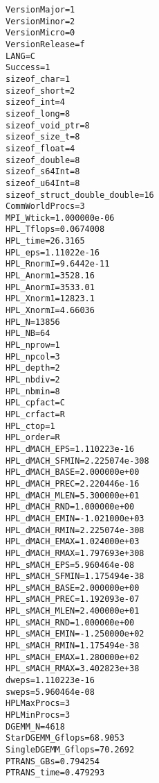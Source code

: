 \documentclass[a4paper]{report}
\begin{document}
\begin{minipage}[b]{0.5\linewidth}
\begin{verbatim}
VersionMajor=1
VersionMinor=2
VersionMicro=0
VersionRelease=f
LANG=C
Success=1
sizeof_char=1
sizeof_short=2
sizeof_int=4
sizeof_long=8
sizeof_void_ptr=8
sizeof_size_t=8
sizeof_float=4
sizeof_double=8
sizeof_s64Int=8
sizeof_u64Int=8
sizeof_struct_double_double=16
CommWorldProcs=3
MPI_Wtick=1.000000e-06
HPL_Tflops=0.0674008
HPL_time=26.3165
HPL_eps=1.11022e-16
HPL_RnormI=9.6442e-11
HPL_Anorm1=3528.16
HPL_AnormI=3533.01
HPL_Xnorm1=12823.1
HPL_XnormI=4.66036
HPL_N=13856
HPL_NB=64
HPL_nprow=1
HPL_npcol=3
HPL_depth=2
HPL_nbdiv=2
HPL_nbmin=8
HPL_cpfact=C
HPL_crfact=R
HPL_ctop=1
HPL_order=R
HPL_dMACH_EPS=1.110223e-16
HPL_dMACH_SFMIN=2.225074e-308
HPL_dMACH_BASE=2.000000e+00
HPL_dMACH_PREC=2.220446e-16
HPL_dMACH_MLEN=5.300000e+01
HPL_dMACH_RND=1.000000e+00
HPL_dMACH_EMIN=-1.021000e+03
HPL_dMACH_RMIN=2.225074e-308
HPL_dMACH_EMAX=1.024000e+03
HPL_dMACH_RMAX=1.797693e+308
HPL_sMACH_EPS=5.960464e-08
HPL_sMACH_SFMIN=1.175494e-38
HPL_sMACH_BASE=2.000000e+00
HPL_sMACH_PREC=1.192093e-07
HPL_sMACH_MLEN=2.400000e+01
HPL_sMACH_RND=1.000000e+00
HPL_sMACH_EMIN=-1.250000e+02
HPL_sMACH_RMIN=1.175494e-38
HPL_sMACH_EMAX=1.280000e+02
HPL_sMACH_RMAX=3.402823e+38
dweps=1.110223e-16
sweps=5.960464e-08
HPLMaxProcs=3
HPLMinProcs=3
DGEMM_N=4618
StarDGEMM_Gflops=68.9053
SingleDGEMM_Gflops=70.2692
PTRANS_GBs=0.794254
PTRANS_time=0.479293
\end{verbatim}
\end{minipage}
\hspace{0.5cm}
\end{document}
